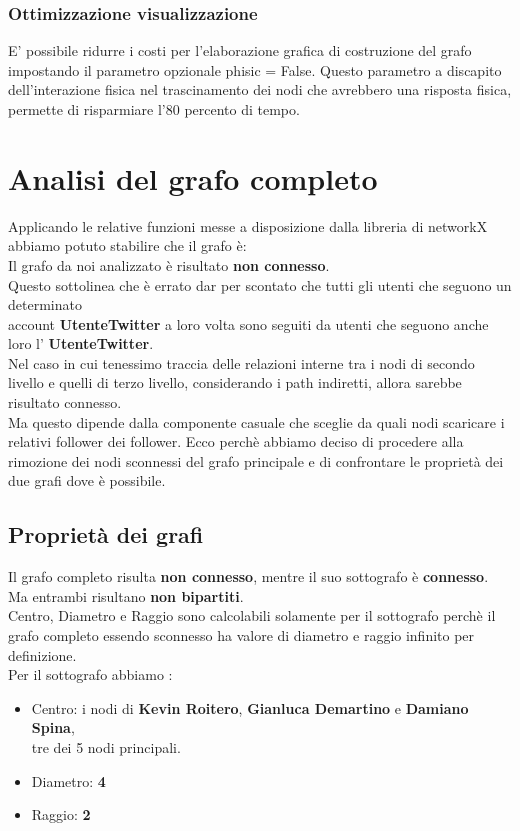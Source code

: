 \documentclass[a4paper,11pt]{report}
\begin{document}
\subsubsection{Ottimizzazione visualizzazione}
E' possibile ridurre i costi per l'elaborazione grafica di costruzione del grafo impostando il parametro opzionale phisic = False. Questo parametro a discapito dell'interazione fisica nel trascinamento  dei nodi che avrebbero una risposta fisica, permette di risparmiare l'80 percento di tempo.

\pagebreak
\section{Analisi del grafo completo}
Applicando le relative funzioni messe a disposizione dalla libreria di networkX abbiamo potuto stabilire che il grafo è:\\
Il grafo da noi analizzato è risultato \textbf{non connesso}.\\
Questo sottolinea che è errato dar per scontato che tutti gli utenti che seguono un determinato \\account \textbf{UtenteTwitter} a loro volta sono seguiti da utenti che seguono anche loro l' \textbf{UtenteTwitter}. \newline \\Nel caso in cui tenessimo traccia delle relazioni interne tra i nodi di secondo livello e quelli di terzo livello, considerando i path indiretti, allora sarebbe risultato connesso.\\ Ma questo dipende dalla componente casuale che sceglie da quali nodi scaricare i relativi follower dei follower.\newline
Ecco perchè abbiamo deciso di procedere alla rimozione dei nodi sconnessi del grafo principale e di confrontare le proprietà dei due grafi dove è possibile.

\subsection{Proprietà dei grafi}
Il grafo completo risulta \textbf{non connesso}, mentre il suo sottografo è \textbf{connesso}.\\
Ma entrambi risultano \textbf{non bipartiti}.\\
Centro, Diametro e Raggio sono calcolabili solamente per il sottografo perchè il grafo completo essendo sconnesso ha valore di diametro e raggio infinito per definizione.\\
Per il sottografo abbiamo :
		\begin{itemize}
			\item Centro: i nodi di \textbf{Kevin Roitero}, \textbf{Gianluca Demartino} e \textbf{Damiano Spina},\\ tre dei 5 nodi principali.
			\item Diametro:  \textbf{4}
			\item Raggio: \textbf{2}
		\end{itemize}
\end{document}
